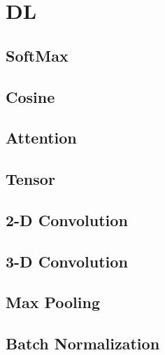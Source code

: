 
\chapter{DL}

\section{SoftMax}

\section{Cosine}

\section{Attention}

\section{Tensor}

\section{2-D Convolution}

\section{3-D Convolution}

\section{Max Pooling}

\section{Batch Normalization}

